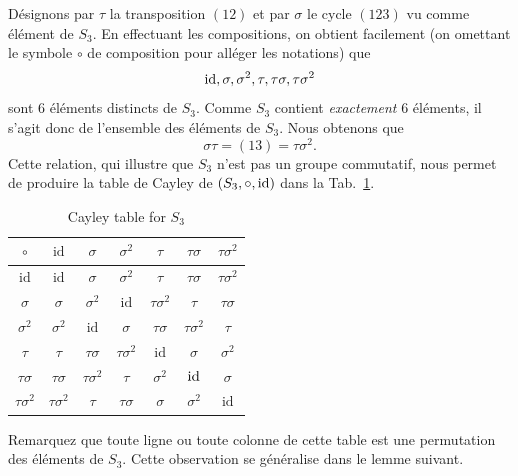 \documentclass[french,course,oneside,theoremnosection]{lecture}
\begin{document}
\begin{example}
Désignons par $\tau$ la transposition $(12)$ et par $\sigma$ le cycle $(123)$ vu comme élément de $S_3$. En effectuant les compositions, on obtient facilement (on omettant le symbole $\circ$ de composition pour alléger les notations) que
\[
\operatorname{id}, \sigma, \sigma^2, \tau, \tau\sigma, \tau\sigma^2
\]
sont 6 éléments distincts de $S_3$. Comme $S_3$ contient \emph{exactement} 6 éléments, il s'agit donc de l'ensemble des éléments de $S_3$. Nous obtenons que
\[
\sigma\tau = (13) = \tau\sigma^2.
\]
Cette relation, qui illustre que $S_3$ n'est pas un groupe commutatif, nous permet de produire la table de Cayley de $(S_3, \circ, \operatorname{id})$ dans la Tab.~\ref{fig:S3}.
\begin{table}
\centering
  \begin{tabular}{c|cccccc}
    $\circ$ & $\text{id}$ & $\sigma$ & $\sigma^2$ & $\tau$ & $\tau\sigma$ & $\tau\sigma^2$ \\
    \hline
    $\text{id}$ & $\text{id}$ & $\sigma$ & $\sigma^2$ & $\tau$ & $\tau\sigma$ & $\tau\sigma^2$ \\
    $\sigma$ & $\sigma$ & $\sigma^2$ & $\text{id}$ & $\tau\sigma^2$ & $\tau$ & $\tau\sigma$ \\
    $\sigma^2$ & $\sigma^2$ & $\text{id}$ & $\sigma$ & $\tau\sigma$ & $\tau\sigma^2$ & $\tau$ \\
    $\tau$ & $\tau$ & $\tau\sigma$ & $\tau\sigma^2$ & $\text{id}$ & $\sigma$ & $\sigma^2$ \\
    $\tau\sigma$ & $\tau\sigma$ & $\tau\sigma^2$ & $\tau$ & $\sigma^2$ & $\operatorname{id}$ & $\sigma$ \\
    $\tau\sigma^2$ & $\tau\sigma^2$ & $\tau$ & $\tau\sigma$ & $\sigma$ & $\sigma^2$ & $\text{id}$ \\
  \end{tabular}
  \caption{Cayley table for $S_3$}\label{fig:S3}
\end{table}

Remarquez que toute ligne ou toute colonne de cette table est une permutation des éléments de $S_3$. Cette observation se généralise dans le lemme suivant.
\end{example}
\end{document}
